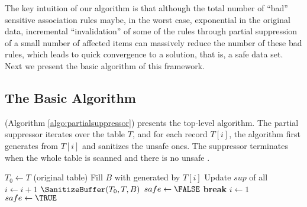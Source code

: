 The key intuition of our algorithm is that although the total number of
``bad'' sensitive association rules
maybe, in the worst case, exponential in the original data, incremental
``invalidation'' of some of the rules through partial suppression of a
small number of affected items can massively reduce the number of these bad
rules, which leads to quick convergence to a solution, that is, a
safe data set.
%
Next we present the basic algorithm of this framework.

\subsection{The Basic Algorithm}
\label{sec:basic}

\PartialSuppressor (Algorithm \ref{algo:partialsuppressor}) presents the
top-level algorithm. The partial suppressor iterates over the table $T$, and
for each record $T[i]$, the algorithm first generates  \qids from $T[i]$ and
sanitizes the unsafe ones. The suppressor terminates when the whole table is
scanned and there is no unsafe \qid.

\vspace{-6mm}
\begin{algorithm}[h]
\small
\caption{$\PartialSuppressor(T,\bmax)$}
\label{algo:partialsuppressor}
\begin{algorithmic}[1]
\STATE $T_0 \gets T$ (original table)
    \LOOP
         \label{algo:enu_s}
             \STATE Fill $B$ with \qids generated by $T[i]$ \label{algo:enumerate1}
             \STATE Update $sup$ of all \qids \label{algo:enumerate2}
             \STATE $i\leftarrow i+1$
        \ENDWHILE \label{algo:enu_e}
        \label{line:containunsafe}
            \STATE $\SanitizeBuffer(T_0, T, B)$\label{line:sanitizebuffer}
            \STATE $safe\leftarrow\FALSE$
        \ENDIF
            \STATE \textbf{break}\label{algo:partialbreak}
                \STATE $i\leftarrow 1$
                \STATE $safe\leftarrow\TRUE$
        \ENDIF
    \ENDLOOP
\end{algorithmic}
\end{algorithm}

